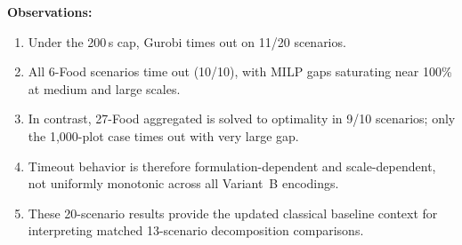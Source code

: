 \documentclass{oqireport}
\begin{document}
\noindent\textbf{Observations:}
\begin{enumerate}[label=(\arabic*)]
\item Under the 200\,s cap, Gurobi times out on 11/20 scenarios.
\item All 6-Food scenarios time out (10/10), with MILP gaps saturating near 100\% at medium and large scales.
\item In contrast, 27-Food aggregated is solved to optimality in 9/10 scenarios; only the 1,000-plot case times out with very large gap.
\item Timeout behavior is therefore formulation-dependent and scale-dependent, not uniformly monotonic across all Variant~B encodings.
\item These 20-scenario results provide the updated classical baseline context for interpreting matched 13-scenario decomposition comparisons.
\end{enumerate}


\end{document}
